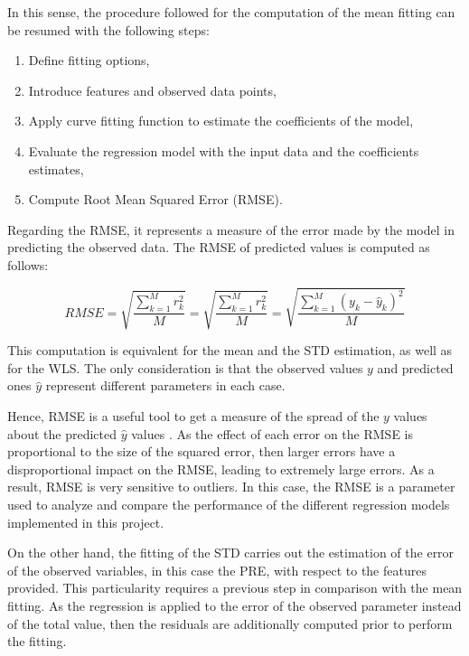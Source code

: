 \documentclass[a4paper, report, oneside, UKenglish]{memoir}
\begin{document}
In this sense, the procedure followed for the computation of the mean fitting can be resumed with the following steps:
\begin{enumerate}
    \item Define fitting options,
    \item Introduce features and observed data points,  
    \item Apply curve fitting function to estimate the coefficients of the model,
    \item Evaluate the regression model with the input data and the coefficients estimates,
    \item Compute Root Mean Squared Error (RMSE). 
\end{enumerate}

Regarding the RMSE, it represents a measure of the error made by the model in predicting the observed data. The RMSE of predicted values is computed as follows:

\begin{equation}
    RMSE = \sqrt{\frac{\sum\limits_{k=1}^{M}{r}_{k}^{2}}{M}} = \sqrt{\frac{\sum\limits_{k=1}^{M}{r}_{k}^{2}}{M}} = \sqrt{\frac{\sum\limits_{k=1}^{M}(y_k - \hat{y}_k)^2}{M}} 
\end{equation}

This computation is equivalent for the mean and the STD estimation, as well as for the WLS. The only consideration is that the observed values $y$ and predicted ones $\hat{y}$ represent different parameters in each case.  
 
Hence, RMSE is a useful tool to get a measure of the spread of the $y$ values about the predicted $\hat{y}$ values \cite{StanfordRMSE}. As the effect of each error on the RMSE is proportional to the size of the squared error, then larger errors have a disproportional impact on the RMSE, leading to extremely large errors. As a result, RMSE is very sensitive to outliers. In this case, the RMSE is a parameter used to analyze and compare the performance of the different regression models implemented in this project.   

On the other hand, the fitting of the STD carries out the estimation of the error of the observed variables, in this case the PRE, with respect to the features provided. This particularity requires a previous step in comparison with the mean fitting. As the regression is applied to the error of the observed parameter instead of the total value, then the residuals are additionally computed prior to perform the fitting.  
\end{document}
